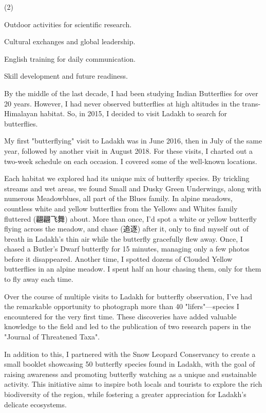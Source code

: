 \documentclass{英语试卷}
\begin{document}
\begin{choices}(2)
  \item Outdoor activities for scientific research.
  \item Cultural exchanges and global leadership.
  \item English training for daily communication.
  \item Skill development and future readiness.
\end{choices}
\par By the middle of the last decade, I had been studying Indian Butterflies for over 20 years. However, I had never observed butterflies at high altitudes in the trans-Himalayan habitat. So, in 2015, I decided to visit Ladakh to search for butterflies.\par
\par My first "butterflying" visit to Ladakh was in June 2016, then in July of the same year, followed by another visit in August 2018. For these visits, I charted out a two-week schedule on each occasion. I covered some of the well-known locations.\par
\par Each habitat we explored had its unique mix of butterfly species. By trickling streams and wet areas, we found Small and Dusky Green Underwings, along with numerous Meadowblues, all part of the Blues family. In alpine meadows, countless white and yellow butterflies from the Yellows and Whites family fluttered (翩翩飞舞) about. More than once, I'd spot a white or yellow butterfly flying across the meadow, and chase (追逐) after it, only to find myself out of breath in Ladakh's thin air while the butterfly gracefully flew away. Once, I chased a Butler's Dwarf butterfly for 15 minutes, managing only a few photos before it disappeared. Another time, I spotted dozens of Clouded Yellow butterflies in an alpine meadow. I spent half an hour chasing them, only for them to fly away each time.\par
\par Over the course of multiple visits to Ladakh for butterfly observation, I've had the remarkable opportunity to photograph more than 40 "lifers"—species I encountered for the very first time. These discoveries have added valuable knowledge to the field and led to the publication of two research papers in the "Journal of Threatened Taxa".\par
\par In addition to this, I partnered with the Snow Leopard Conservancy to create a small booklet showcasing 50 butterfly species found in Ladakh, with the goal of raising awareness and promoting butterfly watching as a unique and sustainable activity. This initiative aims to inspire both locals and tourists to explore the rich biodiversity of the region, while fostering a greater appreciation for Ladakh's delicate ecosystems.\par
\end{document}
